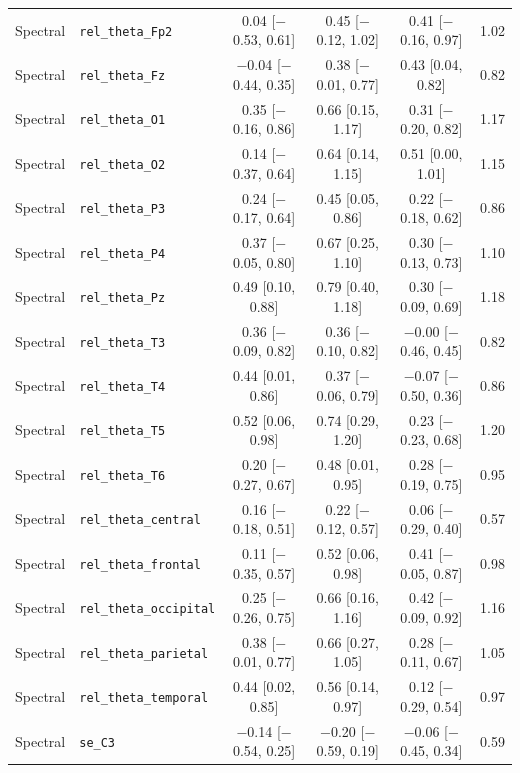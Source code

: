 {\begin{longtable}{llcccc}
Spectral & \texttt{rel\_theta\_Fp2} & 0.04 [$-$0.53, 0.61] & 0.45 [$-$0.12, 1.02] & 0.41 [$-$0.16, 0.97] & 1.02 \\
Spectral & \texttt{rel\_theta\_Fz} & $-$0.04 [$-$0.44, 0.35] & 0.38 [$-$0.01, 0.77] & 0.43 [0.04, 0.82] & 0.82 \\
Spectral & \texttt{rel\_theta\_O1} & 0.35 [$-$0.16, 0.86] & 0.66 [0.15, 1.17] & 0.31 [$-$0.20, 0.82] & 1.17 \\
Spectral & \texttt{rel\_theta\_O2} & 0.14 [$-$0.37, 0.64] & 0.64 [0.14, 1.15] & 0.51 [0.00, 1.01] & 1.15 \\
Spectral & \texttt{rel\_theta\_P3} & 0.24 [$-$0.17, 0.64] & 0.45 [0.05, 0.86] & 0.22 [$-$0.18, 0.62] & 0.86 \\
Spectral & \texttt{rel\_theta\_P4} & 0.37 [$-$0.05, 0.80] & 0.67 [0.25, 1.10] & 0.30 [$-$0.13, 0.73] & 1.10 \\
Spectral & \texttt{rel\_theta\_Pz} & 0.49 [0.10, 0.88] & 0.79 [0.40, 1.18] & 0.30 [$-$0.09, 0.69] & 1.18 \\
Spectral & \texttt{rel\_theta\_T3} & 0.36 [$-$0.09, 0.82] & 0.36 [$-$0.10, 0.82] & $-$0.00 [$-$0.46, 0.45] & 0.82 \\
Spectral & \texttt{rel\_theta\_T4} & 0.44 [0.01, 0.86] & 0.37 [$-$0.06, 0.79] & $-$0.07 [$-$0.50, 0.36] & 0.86 \\
Spectral & \texttt{rel\_theta\_T5} & 0.52 [0.06, 0.98] & 0.74 [0.29, 1.20] & 0.23 [$-$0.23, 0.68] & 1.20 \\
Spectral & \texttt{rel\_theta\_T6} & 0.20 [$-$0.27, 0.67] & 0.48 [0.01, 0.95] & 0.28 [$-$0.19, 0.75] & 0.95 \\
Spectral & \texttt{rel\_theta\_central} & 0.16 [$-$0.18, 0.51] & 0.22 [$-$0.12, 0.57] & 0.06 [$-$0.29, 0.40] & 0.57 \\
Spectral & \texttt{rel\_theta\_frontal} & 0.11 [$-$0.35, 0.57] & 0.52 [0.06, 0.98] & 0.41 [$-$0.05, 0.87] & 0.98 \\
Spectral & \texttt{rel\_theta\_occipital} & 0.25 [$-$0.26, 0.75] & 0.66 [0.16, 1.16] & 0.42 [$-$0.09, 0.92] & 1.16 \\
Spectral & \texttt{rel\_theta\_parietal} & 0.38 [$-$0.01, 0.77] & 0.66 [0.27, 1.05] & 0.28 [$-$0.11, 0.67] & 1.05 \\
Spectral & \texttt{rel\_theta\_temporal} & 0.44 [0.02, 0.85] & 0.56 [0.14, 0.97] & 0.12 [$-$0.29, 0.54] & 0.97 \\
Spectral & \texttt{se\_C3} & $-$0.14 [$-$0.54, 0.25] & $-$0.20 [$-$0.59, 0.19] & $-$0.06 [$-$0.45, 0.34] & 0.59 \\

\end{longtable}}
